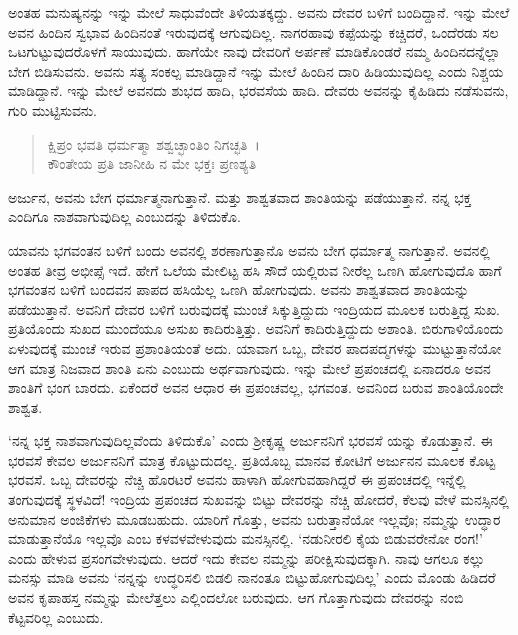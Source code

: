 ಅಂತಹ ಮನುಷ್ಯನನ್ನು ಇನ್ನು ಮೇಲೆ ಸಾಧುವೆಂದೇ ತಿಳಿಯತಕ್ಕದ್ದು. ಅವನು ದೇವರ ಬಳಿಗೆ ಬಂದಿದ್ದಾನೆ. ಇನ್ನು ಮೇಲೆ ಅವನ ಹಿಂದಿನ ಸ್ವಭಾವ ಹಿಂದಿನಂತೆ ಇರುವುದಕ್ಕೆ ಆಗುವುದಿಲ್ಲ. ನಾಗರಹಾವು ಕಪ್ಪೆಯನ್ನು ಕಚ್ಚಿದರೆ, ಒಂದೆರಡು ಸಲ ಒಟಗುಟ್ಟುವುದರೊಳಗೆ ಸಾಯುವುದು. ಹಾಗೆಯೇ ನಾವು ದೇವರಿಗೆ ಅರ್ಪಣೆ ಮಾಡಿಕೊಂಡರೆ ನಮ್ಮ ಹಿಂದಿನದನ್ನೆಲ್ಲಾ ಬೇಗ ಬಿಡಿಸುವನು. ಅವನು ಸತ್ಯ ಸಂಕಲ್ಪ ಮಾಡಿದ್ದಾನೆ ಇನ್ನು ಮೇಲೆ ಹಿಂದಿನ ದಾರಿ ಹಿಡಿಯುವುದಿಲ್ಲ ಎಂದು ನಿಶ್ಚಯ ಮಾಡಿದ್ದಾನೆ. ಇನ್ನು ಮೇಲೆ ಅವನದು ಶುಭದ ಹಾದಿ, ಭರವಸೆಯ ಹಾದಿ. ದೇವರು ಅವನನ್ನು ಕೈಹಿಡಿದು ನಡೆಸುವನು, ಗುರಿ ಮುಟ್ಟಿಸುವನು.

\begin{verse}
ಕ್ಷಿಪ್ರಂ ಭವತಿ ಧರ್ಮತ್ಮಾ ಶಶ್ವಚ್ಛಾಂತಿಂ ನಿಗಚ್ಛತಿ~।\\ಕೌಂತೇಯ ಪ್ರತಿ ಜಾನೀಹಿ ನ ಮೇ ಭಕ್ತಃ ಪ್ರಣಶ್ಯತಿ 
\end{verse}

{\small ಅರ್ಜುನ, ಅವನು ಬೇಗ ಧರ್ಮಾತ್ಮನಾಗುತ್ತಾನೆ. ಮತ್ತು ಶಾಶ್ವತವಾದ ಶಾಂತಿಯನ್ನು ಪಡೆಯುತ್ತಾನೆ. ನನ್ನ ಭಕ್ತ ಎಂದಿಗೂ ನಾಶವಾಗುವುದಿಲ್ಲ ಎಂಬುದನ್ನು ತಿಳಿದುಕೊ.}

ಯಾವನು ಭಗವಂತನ ಬಳಿಗೆ ಬಂದು ಅವನಲ್ಲಿ ಶರಣಾಗುತ್ತಾನೊ ಅವನು ಬೇಗ ಧರ್ಮಾತ್ಮ ನಾಗುತ್ತಾನೆ. ಅವನಲ್ಲಿ ಅಂತಹ ತೀವ್ರ ಅಭೀಪ್ಸೆ ಇದೆ. ಹೇಗೆ ಒಲೆಯ ಮೇಲಿಟ್ಟ ಹಸಿ ಸೌದೆ ಯಲ್ಲಿರುವ ನೀರೆಲ್ಲ ಒಣಗಿ ಹೋಗುವುದೊ ಹಾಗೆ ಭಗವಂತನ ಬಳಿಗೆ ಬಂದವನ ಪಾಪದ ಹಸಿಯೆಲ್ಲ ಒಣಗಿ ಹೋಗುವುದು. ಅವನು ಶಾಶ್ವತವಾದ ಶಾಂತಿಯನ್ನು ಪಡೆಯುತ್ತಾನೆ. ಅವನಿಗೆ ದೇವರ ಬಳಿಗೆ ಬರುವುದಕ್ಕೆ ಮುಂಚೆ ಸಿಕ್ಕುತ್ತಿದ್ದುದು ಇಂದ್ರಿಯದ ಮೂಲಕ ಬರುತ್ತಿದ್ದ ಸುಖ. ಪ್ರತಿಯೊಂದು ಸುಖದ ಮುಂದೆಯೂ ಅಸುಖ ಕಾದಿರುತ್ತಿತ್ತು. ಅವನಿಗೆ ಕಾದಿರುತ್ತಿದ್ದುದು ಅಶಾಂತಿ. ಬಿರುಗಾಳಿಯೊಂದು ಏಳುವುದಕ್ಕೆ ಮುಂಚೆ ಇರುವ ಪ್ರಶಾಂತಿಯಂತೆ ಅದು. ಯಾವಾಗ ಒಬ್ಬ, ದೇವರ ಪಾದಪದ್ಮಗಳನ್ನು ಮುಟ್ಟುತ್ತಾನೆಯೋ ಆಗ ಮಾತ್ರ ನಿಜವಾದ ಶಾಂತಿ ಏನು ಎಂಬುದು ಅರ್ಥವಾಗುವುದು. ಇನ್ನು ಮೇಲೆ ಪ್ರಪಂಚದಲ್ಲಿ ಏನಾದರೂ ಅವನ ಶಾಂತಿಗೆ ಭಂಗ ಬಾರದು. ಏಕೆಂದರೆ ಅವನ ಆಧಾರ ಈ ಪ್ರಪಂಚವಲ್ಲ, ಭಗವಂತ. ಅವನಿಂದ ಬರುವ ಶಾಂತಿಯೊಂದೇ ಶಾಶ್ವತ.

‘ನನ್ನ ಭಕ್ತ ನಾಶವಾಗುವುದಿಲ್ಲವೆಂದು ತಿಳಿದುಕೊ’ ಎಂದು ಶ‍್ರೀಕೃಷ್ಣ ಅರ್ಜುನನಿಗೆ ಭರವಸೆ ಯನ್ನು ಕೊಡುತ್ತಾನೆ. ಈ ಭರವಸೆ ಕೇವಲ ಅರ್ಜುನನಿಗೆ ಮಾತ್ರ ಕೊಟ್ಟುದುದಲ್ಲ. ಪ್ರತಿಯೊಬ್ಬ ಮಾನವ ಕೋಟಿಗೆ ಅರ್ಜುನನ ಮೂಲಕ ಕೊಟ್ಟ ಭರವಸೆ. ಒಬ್ಬ ದೇವರನ್ನು ನೆಚ್ಚಿ ಹೊರಟರೆ ಅವನು ಹಾಳಾಗಿ ಹೋಗುವಹಾಗಿದ್ದರೆ ಈ ಪ್ರಪಂಚದಲ್ಲಿ ಇನ್ನೆಲ್ಲಿ ತಂಗುವುದಕ್ಕೆ ಸ್ಥಳವಿದೆ! ಇಂದ್ರಿಯ ಪ್ರಪಂಚದ ಸುಖವನ್ನು ಬಿಟ್ಟು ದೇವರನ್ನು ನೆಚ್ಚಿ ಹೋದರೆ, ಕೆಲವು ವೇಳೆ ಮನಸ್ಸಿನಲ್ಲಿ ಅನುಮಾನ ಅಂಜಿಕೆಗಳು ಮೂಡಬಹುದು. ಯಾರಿಗೆ ಗೊತ್ತು, ಅವನು ಬರುತ್ತಾನೆಯೋ ಇಲ್ಲವೊ; ನಮ್ಮನ್ನು ಉದ್ಧಾರ ಮಾಡುತ್ತಾನೆಯೊ ಇಲ್ಲವೊ ಎಂಬ ಕಳವಳವೇಳುವುದು ಮನಸ್ಸಿನಲ್ಲಿ. ‘ನಡುನೀರಲಿ ಕೈಯ ಬಿಡುವರೇನೋ ರಂಗ!’ ಎಂದು ಹೇಳುವ ಪ್ರಸಂಗವೇಳುವುದು. ಆದರೆ ಇದು ಕೇವಲ ನಮ್ಮನ್ನು ಪರೀಕ್ಷಿಸುವುದಕ್ಕಾಗಿ. ನಾವು ಆಗಲೂ ಕಲ್ಲು ಮನಸ್ಸು ಮಾಡಿ ಅವನು ‘ನನ್ನನ್ನು ಉದ್ಧರಿಸಲಿ ಬಿಡಲಿ ನಾನಂತೂ ಬಿಟ್ಟುಹೋಗುವುದಿಲ್ಲ’ ಎಂದು ಮೊಂಡು ಹಿಡಿದರೆ ಅವನ ಕೃಪಾಹಸ್ತ ನಮ್ಮನ್ನು ಮೇಲೆತ್ತಲು ಎಲ್ಲಿಂದಲೋ ಬರುವುದು. ಆಗ ಗೊತ್ತಾಗುವುದು ದೇವರನ್ನು ನಂಬಿ ಕೆಟ್ಟವರಿಲ್ಲ ಎಂಬುದು.

